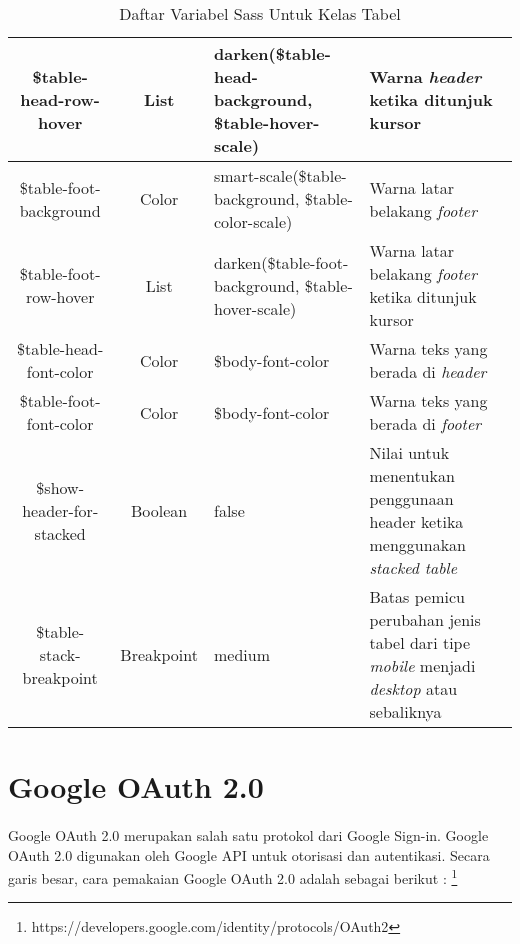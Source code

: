 \begin{center}
\begin{table}[H]
\begin{tabular}{|c|c|p{4cm}|p{5cm}|}
			 	\hline
			 	\$table-head-row-hover & List & darken(\$table-head-background, \$table-hover-scale) & Warna \textit{header} ketika ditunjuk kursor\\
			 	\hline
			 	\$table-foot-background & Color & smart-scale(\$table-background, \$table-color-scale) & Warna latar belakang \textit{footer} \\
			 	\hline
			 	\$table-foot-row-hover & List & darken(\$table-foot-background, \$table-hover-scale) & Warna latar belakang \textit{footer} ketika ditunjuk kursor \\
			 	\hline
			 	\$table-head-font-color & Color & \$body-font-color & Warna teks yang berada di \textit{header} \\
			 	\hline
			 	\$table-foot-font-color & Color & \$body-font-color & Warna teks yang berada di \textit{footer} \\
			 	\hline
			 	\$show-header-for-stacked & Boolean & false & Nilai untuk menentukan penggunaan header ketika menggunakan \textit{stacked table} \\
			 	\hline
			 	\$table-stack-breakpoint & Breakpoint & medium & Batas pemicu perubahan jenis tabel dari tipe \textit{mobile} menjadi \textit{desktop} atau sebaliknya \\
			 	\hline
	\end{tabular}
	\caption{Daftar Variabel Sass Untuk Kelas Tabel}
	\end{table}
\end{center}

\section{Google OAuth 2.0} %
\label{googleoauth}

\paragraph{} Google OAuth 2.0 merupakan salah satu protokol dari Google Sign-in. Google OAuth 2.0 digunakan oleh Google API untuk otorisasi dan autentikasi. Secara garis besar, cara pemakaian Google OAuth 2.0 adalah sebagai berikut : \footnote{https://developers.google.com/identity/protocols/OAuth2}


